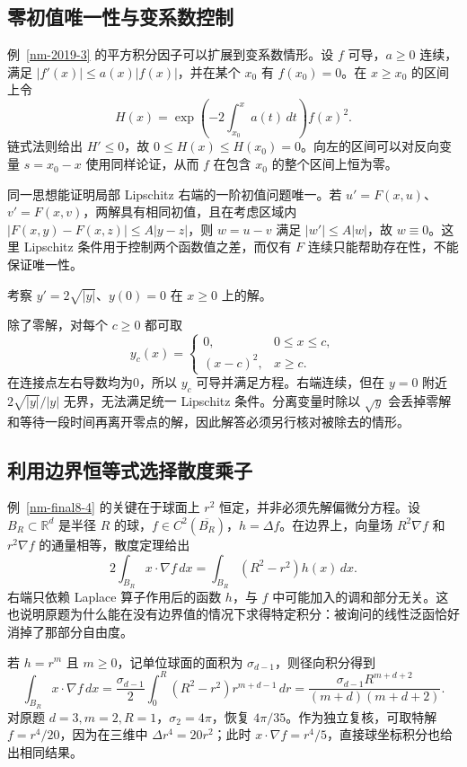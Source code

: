 \documentclass[12pt,fontset=fandol]{ctexart}
\begin{document}
\subsection{零初值唯一性与变系数控制}
例~\ref{nm-2019-3} 的平方积分因子可以扩展到变系数情形。设 $f$ 可导，$a\geq0$ 连续，满足 $|f'(x)|\leq a(x)|f(x)|$，并在某个 $x_0$ 有 $f(x_0)=0$。在 $x\geq x_0$ 的区间上令
\[
 H(x)=\exp\left(-2\int_{x_0}^xa(t)\,dt\right)f(x)^2.
\]
链式法则给出 $H'\leq0$，故 $0\leq H(x)\leq H(x_0)=0$。向左的区间可以对反向变量 $s=x_0-x$ 使用同样论证，从而 $f$ 在包含 $x_0$ 的整个区间上恒为零。

同一思想能证明局部 Lipschitz 右端的一阶初值问题唯一。若 $u'=F(x,u)$、$v'=F(x,v)$，两解具有相同初值，且在考虑区域内 $|F(x,y)-F(x,z)|\leq A|y-z|$，则 $w=u-v$ 满足 $|w'|\leq A|w|$，故 $w\equiv0$。这里 Lipschitz 条件用于控制两个函数值之差，而仅有 $F$ 连续只能帮助存在性，不能保证唯一性。

\begin{example}
考察 $y'=2\sqrt{|y|}$、$y(0)=0$ 在 $x\geq0$ 上的解。
\end{example}
\begin{solve}
除了零解，对每个 $c\geq0$ 都可取
\[
 y_c(x)=\begin{cases}0,&0\leq x\leq c,\\(x-c)^2,&x\geq c.\end{cases}
\]
在连接点左右导数均为0，所以 $y_c$ 可导并满足方程。右端连续，但在 $y=0$ 附近 $2\sqrt{|y|}/|y|$ 无界，无法满足统一 Lipschitz 条件。分离变量时除以 $\sqrt y$ 会丢掉零解和等待一段时间再离开零点的解，因此解答必须另行核对被除去的情形。
\end{solve}

\subsection{利用边界恒等式选择散度乘子}
例~\ref{nm-final8-4} 的关键在于球面上 $r^2$ 恒定，并非必须先解偏微分方程。设 $B_R\subset\mathbb R^d$ 是半径 $R$ 的球，$f\in C^2(\overline{B_R})$，$h=\Delta f$。在边界上，向量场 $R^2\nabla f$ 和 $r^2\nabla f$ 的通量相等，散度定理给出
\[
 2\int_{B_R}x\cdot\nabla f\,dx
 =\int_{B_R}(R^2-r^2)h(x)\,dx.
\]
右端只依赖 Laplace 算子作用后的函数 $h$，与 $f$ 中可能加入的调和部分无关。这也说明原题为什么能在没有边界值的情况下求得特定积分：被询问的线性泛函恰好消掉了那部分自由度。

若 $h=r^m$ 且 $m\geq0$，记单位球面的面积为 $\sigma_{d-1}$，则径向积分得到
\[
 \int_{B_R}x\cdot\nabla f\,dx
 =\frac{\sigma_{d-1}}2\int_0^R(R^2-r^2)r^{m+d-1}\,dr
 =\frac{\sigma_{d-1}R^{m+d+2}}{(m+d)(m+d+2)}.
\]
对原题 $d=3,m=2,R=1$，$\sigma_2=4\pi$，恢复 $4\pi/35$。作为独立复核，可取特解 $f=r^4/20$，因为在三维中 $\Delta r^4=20r^2$；此时 $x\cdot\nabla f=r^4/5$，直接球坐标积分也给出相同结果。
\end{document}
